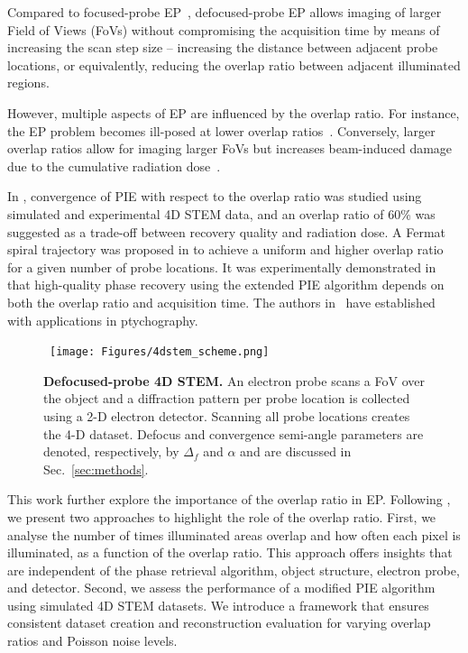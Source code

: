 \documentclass[11pt,draftclsnofoot,onecolumn]{IEEEtran}
\begin{document}
Compared to focused-probe EP~\cite{ophus2019four,robinson2024high,nellist1995resolution}, defocused-probe EP allows imaging of larger Field of Views (FoVs) without compromising the acquisition time by means of increasing the scan step size -- \ie increasing the distance between adjacent probe locations, or equivalently, reducing the overlap ratio between adjacent illuminated regions. 

However, multiple aspects of EP are influenced by the overlap ratio. For instance, the EP problem becomes ill-posed at lower overlap ratios~\cite{song2019atomic}. Conversely, larger overlap ratios allow for imaging larger FoVs but increases  beam-induced damage due to the cumulative radiation dose~\cite{moshtaghpour2024diffusion,jannis2022reducingpart2}. 

In \cite{bunk2008influence}, convergence of PIE with respect to the overlap ratio was studied using simulated and experimental 4D STEM data, and an overlap ratio of 60\% was suggested as a  trade-off between recovery quality and radiation dose. A Fermat spiral trajectory was proposed in \cite{Huang2014optimization} to achieve a uniform and higher overlap ratio for a given number of probe locations. It was experimentally demonstrated in \cite{song2019atomic} that high-quality phase recovery using the extended PIE algorithm depends on both the overlap ratio and acquisition time. The authors in~\cite{bendory2023near,bendory2019blind,jaganathan2016stft,iwen2023phase} have established  with applications in ptychography.

\begin{figure}[!t]
    \centering\
    \texttt{[image: Figures/4dstem\_scheme.png]}
\caption{\textbf{Defocused-probe 4D STEM.} An electron probe scans a FoV over the object and a diffraction pattern per probe location is collected using a 2-D electron detector. Scanning all probe locations creates the 4-D dataset. Defocus and convergence semi-angle parameters are denoted, respectively, by $\Delta_f$ and $\alpha$ and are discussed in Sec.~\ref{sec:methods}.}
    \label{fig:4d-stem-schematic}
\end{figure}

This work further explore the importance of the overlap ratio in EP. Following \cite{bunk2008influence}, we present two approaches to highlight the role of the overlap ratio. First, we analyse the number of times illuminated areas overlap and how often each pixel is illuminated, as a function of the overlap ratio. This approach offers insights that are independent of the phase retrieval algorithm, object structure, electron probe, and detector. Second, we assess the performance of a modified PIE algorithm using simulated 4D STEM datasets. We introduce a framework that ensures consistent dataset creation and reconstruction evaluation for varying overlap ratios and Poisson noise levels.
\end{document}
